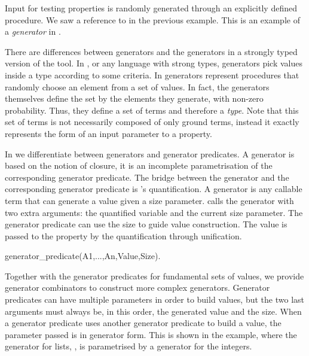 Input for testing properties is randomly generated through an explicitly
defined procedure.
%
We saw a reference to  in the previous example.
%
This is an example of a \emph{generator} in \plqc{}.




There are  differences between \plqc{} generators and the
generators in a strongly typed version of the tool.
%
In \Haskell{} \QuickCheck{}, or any language with strong types,
generators pick values inside a type according to some criteria.
%
In \plqc{} generators represent procedures that randomly choose an element
from a set of values.
%
In fact, the generators themselves define the set by the elements
they generate, with non-zero probability.
%
Thus, they define a set of terms and therefore a \emph{type}.
%
Note that this set of terms is not necessarily composed of only ground
terms, instead it
 exactly represents
the form of an input parameter to a
property.


In \plqc{} we differentiate between generators and generator
predicates.
%
A generator is based on the notion of closure, it is an incomplete
parametrisation of the corresponding generator predicate.
%
The bridge between the generator and the corresponding generator
predicate is %
\plqc{}'s quantification.
%
A generator is any callable term that can generate a value given a
size parameter.
%
\plqc{} 
calls the generator with two extra
arguments: the quantified variable and the current size parameter.
%
The generator predicate can use the size to guide value
construction.
%
The value is passed to the property by the \plqc{} quantification
through unification.


\begin{yapcode}
 generator_predicate(A1,...,An,Value,Size).
\end{yapcode}
%
Together with the generator predicates for fundamental sets of values, we %
provide
 generator combinators to construct more complex
generators.
%
Generator predicates can have multiple parameters in order to build
values, but the two last arguments must always be, in this order, the
generated value and the size.
%
When a generator predicate uses another generator predicate to build a
value, the parameter passed is in generator form.
%
This is shown in the example,
where the generator for lists, , is parametrised by a
generator for the integers.


